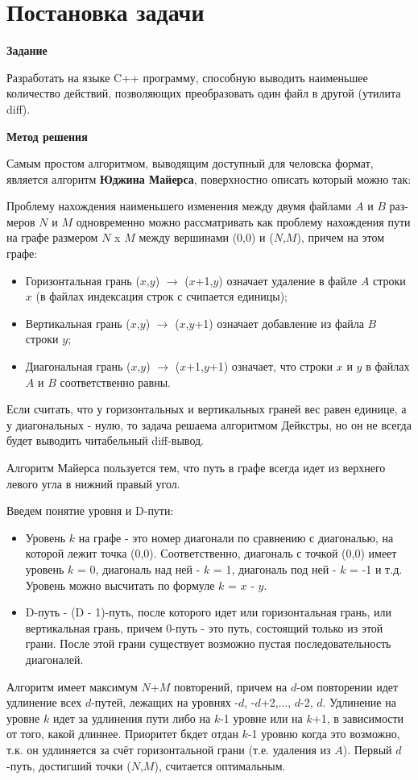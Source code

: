 \section{Постановка задачи}

\textbf{Задание}

Разработать на языке C++ программу, способную выводить наименьшее количество действий, позволяющих преобразовать один файл в другой (утилита diff).

\textbf{Метод решения}

Самым простом алгоритмом, выводящим доступный для человска формат, является
алгоритм \textbf{Юджина Майерса}, поверхностно описать который можно так:

Проблему нахождения наименьшего изменения между двумя файлами $A$ и $B$ раз-
меров $N$ и $M$ одновременно можно рассматривать как проблему нахождения пути на графе размером $N$ x $M$ между вершинами (0,0) и ($N$,$M$), причем на этом графе:

\begin{itemize}
    \item Горизонтальная грань ($x$,$y$) $\rightarrow$ ($x$+1,$y$) означает удаление в файле $A$ строки $x$ (в файлах индексация строк с счипается единицы);
    \item Вертикальная грань ($x$,$y$) $\rightarrow$ ($x$,$y$+1) означает добавление из файла $B$ строки $y$;
    \item Диагональная грань ($x$,$y$) $\rightarrow$ ($x$+1,$y$+1) означает, что строки $x$ и $y$ в файлах $A$ и $B$ соответственно равны.
\end{itemize}

Если считать, что у горизонтальных и вертикальных граней вес равен единице, а у
диагональных - нулю, то задача решаема алгоритмом Дейкстры, но он не всегда будет
выводить читабельный diff-вывод.

Алгоритм Майерса пользуется тем, что путь в графе всегда идет из верхнего левого
угла в нижний правый угол.

Введем понятие уровня и D-пути:
\begin{itemize}
    \item Уровень $k$ на графе - это номер диагонали по сравнению с диагональю, на которой
лежит точка (0,0). Соответственно, диагональ с точкой (0,0) имеет уровень $k$ = 0, диагональ над ней - $k$ = 1, диагональ под ней - $k$ = -1 и т.д. Уровень можно высчитать по формуле $k$ = $x$ - $y$.
    \item D-путь -  (D - 1)-путь, после которого идет или горизонтальная грань, или вертикальная грань, причем 0-путь - это путь, состоящий только из этой грани. После этой грани существует возможно пустая последовательность диагоналей.
\end{itemize}

Алгоритм имеет максимум $N$+$M$ повторений, причем на $d$-ом повторении идет удлинение всех $d$-путей, лежащих на уровнях -$d$, -$d$+2,..., $d$-2, $d$. Удлинение на уровне $k$ идет за удлинения пути либо на $k$-1 уровне или на $k$+1, в зависимости от того, какой длиннее. Приоритет бкдет отдан $k$-1 уровню когда это возможно, т.к. он удлиняется за счёт горизонтальной грани (т.е. удаления из $A$). Первый $d$-путь, достигший точки ($N$,$M$), считается оптимальным.

\pagebreak
